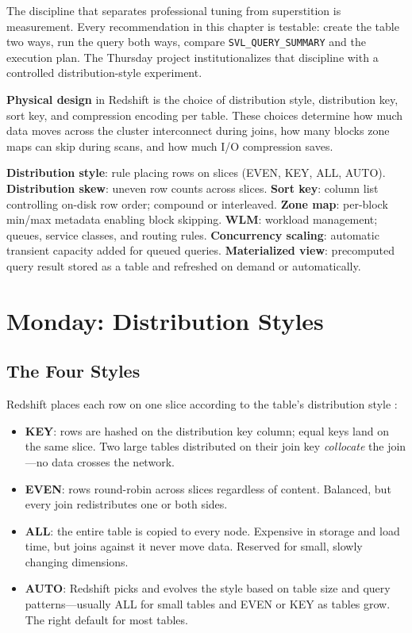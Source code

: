 The discipline that separates professional tuning from superstition is measurement. Every recommendation in this chapter is testable: create the table two ways, run the query both ways, compare \texttt{SVL\_QUERY\_SUMMARY} and the execution plan. The Thursday project institutionalizes that discipline with a controlled distribution-style experiment.

\begin{definitionbox}
\textbf{Physical design} in Redshift is the choice of distribution style, distribution key, sort key, and compression encoding per table. These choices determine how much data moves across the cluster interconnect during joins, how many blocks zone maps can skip during scans, and how much I/O compression saves.
\end{definitionbox}

\begin{keyterms}
\textbf{Distribution style}: rule placing rows on slices (EVEN, KEY, ALL, AUTO). \textbf{Distribution skew}: uneven row counts across slices. \textbf{Sort key}: column list controlling on-disk row order; compound or interleaved. \textbf{Zone map}: per-block min/max metadata enabling block skipping. \textbf{WLM}: workload management; queues, service classes, and routing rules. \textbf{Concurrency scaling}: automatic transient capacity added for queued queries. \textbf{Materialized view}: precomputed query result stored as a table and refreshed on demand or automatically.
\end{keyterms}

\section{Monday: Distribution Styles}
\subsection{The Four Styles}
Redshift places each row on one slice according to the table's distribution style \cite{awsRedshiftDocs}:
\begin{itemize}
    \item \textbf{KEY}: rows are hashed on the distribution key column; equal keys land on the same slice. Two large tables distributed on their join key \emph{collocate} the join---no data crosses the network.
    \item \textbf{EVEN}: rows round-robin across slices regardless of content. Balanced, but every join redistributes one or both sides.
    \item \textbf{ALL}: the entire table is copied to every node. Expensive in storage and load time, but joins against it never move data. Reserved for small, slowly changing dimensions.
    \item \textbf{AUTO}: Redshift picks and evolves the style based on table size and query patterns---usually ALL for small tables and EVEN or KEY as tables grow. The right default for most tables.
\end{itemize}

